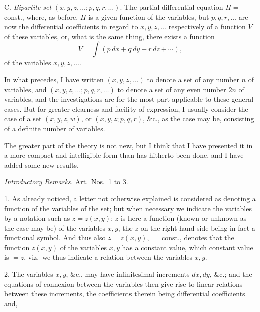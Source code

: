 \documentclass[11pt,a4paper]{article}
\begin{document}
\noindent C. \emph{Bipartite set} $(x, y, z, \ldots; p, q, r, \ldots)$. The partial differential equation $H = $ const., where, as before, $H$ is a given function of the variables, but $p, q, r, \ldots$ are now the differential coefficients in regard to $x, y, z, \ldots$ respectively of a function $V$ of these variables, or, what is the same thing, there exists a function
\[
V = \int (p\,dx + q\,dy + r\,dz + \cdots),
\]
of the variables $x, y, z, \ldots$.

In what precedes, I have written $(x, y, z, \ldots)$ to denote a set of any number $n$ of variables, and $(x, y, z, \ldots; p, q, r, \ldots)$ to denote a set of any even number $2n$ of variables, and the investigations are for the most part applicable to these general cases. But for greater clearness and facility of expression, I usually consider the case of a set $(x, y, z, w)$, or $(x, y, z; p, q, r)$, \&c., as the case may be, consisting of a definite number of variables.

The greater part of the theory is not new, but I think that I have presented it in a more compact and intelligible form than has hitherto been done, and I have added some new results.

\bigskip

\begin{center}
\emph{Introductory Remarks.} Art.\ Nos.\ 1 to 3.
\end{center}

\medskip

1. As already noticed, a letter not otherwise explained is considered as denoting a function of the variables of the set; but when necessary we indicate the variables by a notation such as $z = z(x, y)$; $z$ is here a function (known or unknown as the case may be) of the variables $x, y$, the $z$ on the right-hand side being in fact a functional symbol. And thus also $z = z(x, y), = $ const., denotes that the function $z(x, y)$ of the variables $x, y$ has a constant value, which constant value is $= z$, viz.\ we thus indicate a relation between the variables $x, y$.

2. The variables $x, y$, \&c., may have infinitesimal increments $dx, dy$, \&c.; and the equations of connexion between the variables then give rise to linear relations between these increments, the coefficients therein being differential coefficients and,

\newpage

\end{document}
